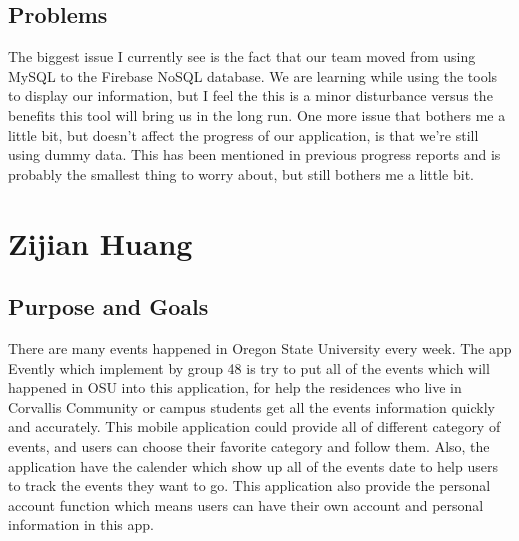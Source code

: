 \documentclass[letterpaper, 10pt,titlepage]{article}
\begin{document}
\subsection{Problems}

The biggest issue I currently see is the fact that our team moved from using MySQL to the Firebase NoSQL database. We are learning while using the tools to display our information, but I feel the this is a minor disturbance versus the benefits this tool will bring us in the long run. One more issue that bothers me a little bit, but doesn't affect the progress of our application, is that we're still using dummy data. This has been mentioned in previous progress reports and is probably the smallest thing to worry about, but still bothers me a little bit. 

\section{Zijian Huang}
\subsection{Purpose and Goals}
There are many events happened in Oregon State University every week. The app Evently which implement by group 48 is try to put all of the events which will happened in OSU into this application, for help the residences who live in Corvallis Community or campus students get all the events information quickly and accurately. This mobile application could provide all of different category of events, and users can choose their favorite category and follow them. Also, the application have the calender which show up all of the events date to help users to track the events they want to go. This application also provide the personal account function which means users can have their own account and personal information in this app. 
\end{document}
